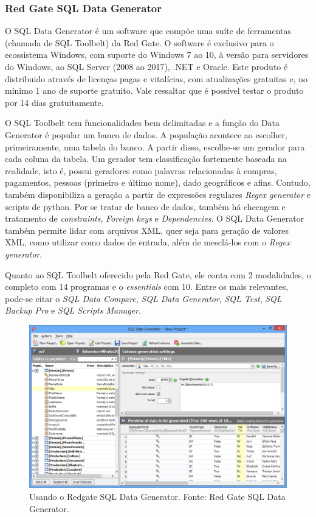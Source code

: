 \documentclass[
	12pt,				%
	openright,			%
	twoside,			%
	a4paper,			%
	english,			%
	brazil				%
	]{abntex2}
\begin{document}
	\subsubsection{Red Gate SQL Data Generator}
	O SQL Data Generator \cite{RedgateSQLDataGenerator} é um software que compõe uma suíte de ferramentas (chamada de SQL Toolbelt) da Red Gate.
	O software é exclusivo para o ecossistema Windows, com suporte do Windows 7 ao 10, à versão para servidores do Windows, ao SQL Server (2008 ao 2017), .NET e Oracle.
	Este produto é distribuido através de licenças pagas e vitalícias, com atualizações gratuitas e, no mínimo 1 ano de suporte gratuito.
	Vale ressaltar que é possível testar o produto por 14 dias gratuitamente.
	\par
	O SQL Toolbelt tem funcionalidades bem delimitadas e a função do Data Generator é popular um banco de dados. 
	A população acontece ao escolher, primeiramente, uma tabela do banco.
	A partir disso, escolhe-se um gerador para cada coluna da tabela.
	Um gerador tem classificação fortemente baseada na realidade, isto é, possui geradores como palavras relacionadas à compras, pagamentos, pessoas (primeiro e último nome), dado geográficos e afins.
	Contudo, também disponibiliza a geração a partir de expressões regulares \emph{Regex generator} e scripts de python.
	Por se tratar de banco de dados, também há checagem e tratamento de \emph{constraints}, \emph{Foreign keys} e \emph{Dependencies}.
	O SQL Data Generator também permite lidar com arquivos XML, quer seja para geração de valores XML, como utilizar como dados de entrada, além de mesclá-los com o \emph{Regex generator}.
	\par
	Quanto ao SQL Toolbelt oferecido pela Red Gate, ele conta com 2 modalidades, o completo com 14 programas e o \emph{essentials} com 10.
	Entre os mais relevantes, pode-se citar o \emph{SQL Data Compare}, \emph{SQL Data Generator}, \emph{SQL Test}, \emph{SQL Backup Pro} e \emph{SQL Scripts Manager}.
	\begin{figure}[h]
		\centering
		\includegraphics[width=\linewidth]{./figures/TrabalhosRelacionados/sql-data-generator.png}
		\caption{Usando o Redgate SQL Data Generator. Fonte: Red Gate SQL Data Generator.}
		\label{fig:RedgateSQLDG}
	\end{figure}
\end{document}
